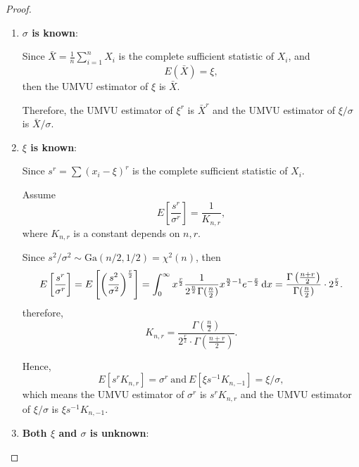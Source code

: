 \begin{proof}
	\begin{enumerate}
		\item \textbf{$\sigma$ is known}:

		      Since $\bar{X}=\frac{1}{n}\sum_{i=1}^{n}X_i$ is the complete sufficient statistic of $X_i$, and
		      \begin{equation*}
			      E(\bar{X})=\xi,
		      \end{equation*}
		      then the UMVU estimator of $\xi$ is $\bar{X}$.

		      Therefore, the UMVU estimator of $\xi^r$ is $\bar{X}^r$ and the UMVU estimator of $\xi/\sigma$ is $\bar{X}/\sigma$.

		\item \textbf{$\xi$ is known}:

		      Since $s^r=\sum\left(x_{i}-\xi\right)^r$ is the complete sufficient statistic of $X_i$.

		      Assume
		      \begin{equation*}
			      E\left[\frac{s^r}{\sigma^r}\right]=\frac{1}{K_{n,r}},
		      \end{equation*}
		      where $K_{n,r}$ is a constant depends on $n,r$.

		      Since $s^2/\sigma^2\sim\text{Ga}(n/2,1/2)=\chi^2(n)$, then
		      \begin{equation*}
			      E\left[\frac{s^r}{\sigma^r}\right]=E\left[\left(\frac{s^2}{\sigma^2}\right)^{\frac{r}{2}}\right]=\int_{0}^{\infty}x^{\frac{r}{2}}\frac{1}{2^{\frac{n}{2}}\Gamma(\frac{n}{2})}x^{\frac{n}{2}-1}e^{-\frac{x}{2}}\mathop{}\!\mathrm{d} x=\frac{\Gamma\left(\frac{n+r}{2}\right)}{\Gamma(\frac{n}{2})}\cdot 2^{\frac{r}{2}}.
		      \end{equation*}
		      therefore,
		      \begin{equation*}
			      K_{n,r}=\frac{\Gamma(\frac{n}{2})}{2^{\frac{r}{2}}\cdot\Gamma\left(\frac{n+r}{2}\right)}.
		      \end{equation*}

		      Hence,
		      \begin{equation*}
			      E\left[s^rK_{n,r}\right]=\sigma^r\ \text{and}\ E[\xi s^{-1}K_{n,-1}]=\xi/\sigma,
		      \end{equation*}
		      which means the UMVU estimator of $\sigma^r$ is $s^rK_{n,r}$ and the UMVU estimator of $\xi/\sigma$ is $\xi s^{-1}K_{n,-1}$.

		\item \textbf{Both $\xi$ and $\sigma$ is unknown}:


\end{enumerate}
\end{proof}
